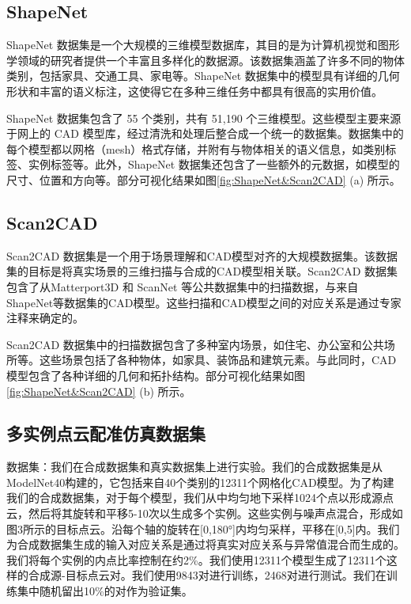 \subsection{ShapeNet}
ShapeNet 数据集是一个大规模的三维模型数据库，其目的是为计算机视觉和图形学领域的研究者提供一个丰富且多样化的数据源。该数据集涵盖了许多不同的物体类别，包括家具、交通工具、家电等。ShapeNet 数据集中的模型具有详细的几何形状和丰富的语义标注，这使得它在多种三维任务中都具有很高的实用价值。

ShapeNet 数据集包含了 55 个类别，共有 51,190 个三维模型。这些模型主要来源于网上的 CAD 模型库，经过清洗和处理后整合成一个统一的数据集。数据集中的每个模型都以网格（mesh）格式存储，并附有与物体相关的语义信息，如类别标签、实例标签等。此外，ShapeNet 数据集还包含了一些额外的元数据，如模型的尺寸、位置和方向等。部分可视化结果如图\ref{fig:ShapeNet&Scan2CAD} (a) 所示。

\subsection{Scan2CAD}
Scan2CAD 数据集是一个用于场景理解和CAD模型对齐的大规模数据集。该数据集的目标是将真实场景的三维扫描与合成的CAD模型相关联。Scan2CAD 数据集包含了从Matterport3D\cite{chang2017matterport3d} 和 ScanNet\cite{dai2017scannet} 等公共数据集中的扫描数据，与来自ShapeNet等数据集的CAD模型。这些扫描和CAD模型之间的对应关系是通过专家注释来确定的。

Scan2CAD 数据集中的扫描数据包含了多种室内场景，如住宅、办公室和公共场所等。这些场景包括了各种物体，如家具、装饰品和建筑元素。与此同时，CAD模型包含了各种详细的几何和拓扑结构。部分可视化结果如图\ref{fig:ShapeNet&Scan2CAD} (b) 所示。

\subsection{多实例点云配准仿真数据集}
数据集：我们在合成数据集和真实数据集上进行实验。我们的合成数据集是从ModelNet40构建的，它包括来自40个类别的12311个网格化CAD模型。为了构建我们的合成数据集，对于每个模型，我们从中均匀地下采样1024个点以形成源点云，然后将其旋转和平移5-10次以生成多个实例。这些实例与噪声点混合，形成如图3所示的目标点云。沿每个轴的旋转在[0,180°]内均匀采样，平移在[0,5]内。我们为合成数据集生成的输入对应关系是通过将真实对应关系与异常值混合而生成的。我们将每个实例的内点比率控制在约2\%。我们使用12311个模型生成了12311个这样的合成源-目标点云对。我们使用9843对进行训练，2468对进行测试。我们在训练集中随机留出10\%的对作为验证集。

